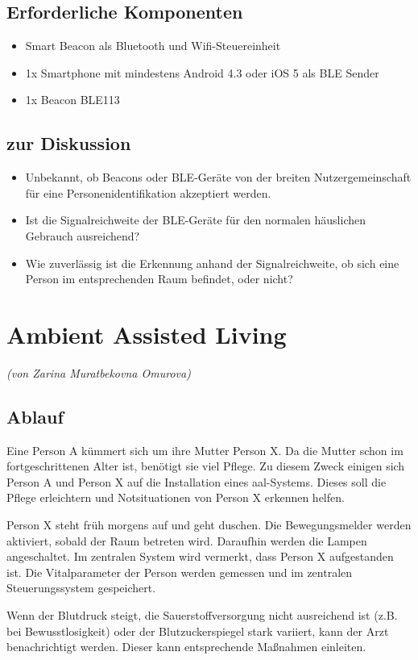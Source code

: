 \subsection{Erforderliche Komponenten}
\begin{itemize}
	\item Smart Beacon als Bluetooth und Wifi-Steuereinheit
	\item 1x Smartphone mit mindestens Android 4.3 oder iOS 5 als BLE Sender
	\item 1x Beacon BLE113
\end{itemize}

\subsection{zur Diskussion}
\begin{itemize}
	\item Unbekannt, ob Beacons oder BLE-Geräte von der breiten Nutzergemeinschaft für eine Personenidentifikation akzeptiert werden.
	\item Ist die Signalreichweite der BLE-Geräte für den normalen häuslichen Gebrauch ausreichend?
	\item Wie zuverlässig ist die Erkennung anhand der Signalreichweite, ob sich eine Person im entsprechenden Raum befindet, oder nicht?
\end{itemize}

\section{Ambient Assisted Living}
\emph{(von Zarina Muratbekovna Omurova)}
\subsection{Ablauf}
Eine Person A kümmert sich um ihre Mutter Person X. Da die Mutter schon im fortgeschrittenen Alter ist, benötigt sie viel Pflege. Zu diesem Zweck einigen sich Person A und Person X auf die Installation eines \gls{aal}-Systems. Dieses soll die Pflege erleichtern und Notsituationen von Person X erkennen helfen.

Person X steht früh morgens auf und geht duschen. Die Bewegungsmelder werden aktiviert, sobald der Raum betreten wird. Daraufhin werden die Lampen angeschaltet. Im zentralen System wird vermerkt, dass Person X aufgestanden ist. Die Vitalparameter der Person werden gemessen und im zentralen Steuerungssystem gespeichert. 

Wenn der Blutdruck steigt, die Sauerstoffversorgung nicht ausreichend ist (z.B. bei Bewusstlosigkeit) oder der Blutzuckerspiegel stark variiert, kann der Arzt benachrichtigt werden. Dieser kann entsprechende Maßnahmen einleiten. 

